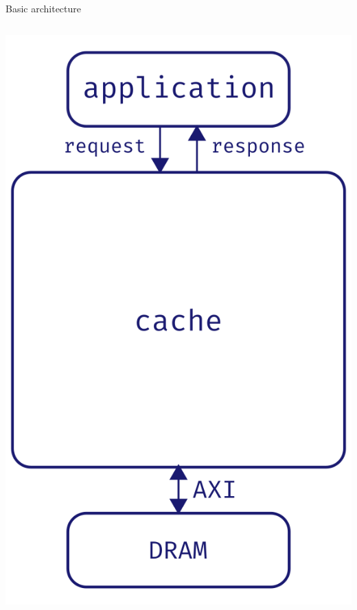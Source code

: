 \documentclass[aspectratio=169]{beamer}
\begin{document}
\begin{frame}{Basic architecture}
\begin{columns}
\begin{column}{.5\textwidth}
\begin{center}
			\includegraphics[height=.7\textheight]{complete_arch}
			\end{center}
		\end{column}
	\end{columns}
\end{frame}
\end{document}
